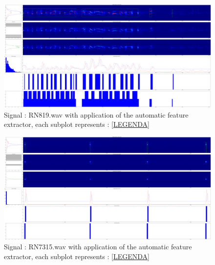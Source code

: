 \documentclass[a4paper]{report}
\begin{document}
\begin{figure}[H]
\begin{center}
\includegraphics[scale=0.07]{7test.png}\caption{Signal : RN819.wav with application of the automatic feature extractor, each subplot represents : \ref{LEGENDA} }
\end{center}
\end{figure}

\begin{figure}[H]
\begin{center}
\includegraphics[scale=0.07]{8test.png}\caption{Signal : RN7315.wav with application of the automatic feature extractor, each subplot represents : \ref{LEGENDA} }
\end{center}
\end{figure}
\end{document}
